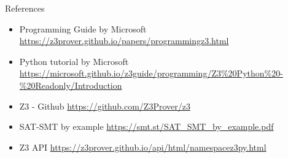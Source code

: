 \documentclass{beamer}
\begin{document}
\begin{frame}{References}
\begin{itemize}
	\item Programming Guide by Microsoft \href{https://z3prover.github.io/papers/programmingz3.html}{https://z3prover.github.io/papers/programmingz3.html}
	\item Python tutorial by Microsoft \href{https://microsoft.github.io/z3guide/programming/Z3\%20Python\%20-\%20Readonly/Introduction}{https://microsoft.github.io/z3guide/programming/Z3\%20Python\%20-\%20Readonly/Introduction} 
	\item Z3 - Github \href{https://github.com/Z3Prover/z3}{https://github.com/Z3Prover/z3}
	\item SAT-SMT by example \href{https://smt.st/SAT\_SMT\_by\_example.pdf}{https://smt.st/SAT\_SMT\_by\_example.pdf}
	\item Z3 API \href{https://z3prover.github.io/api/html/namespacez3py.html}{https://z3prover.github.io/api/html/namespacez3py.html}
 
\end{itemize}
\end{frame}
\end{document}

